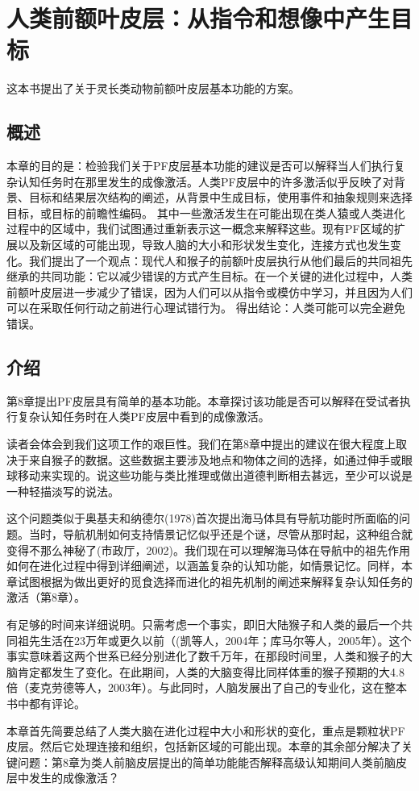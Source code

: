 \chapter{人类前额叶皮层：从指令和想像中产生目标} \label{chap:chap9}
这本书提出了关于灵长类动物前额叶皮层基本功能的方案。

\section{概述}
本章的目的是：检验我们关于PF皮层基本功能的建议是否可以解释当人们执行复杂认知任务时在那里发生的成像激活。人类PF皮层中的许多激活似乎反映了对背景、目标和结果层次结构的阐述，从背景中生成目标，使用事件和抽象规则来选择目标，或目标的前瞻性编码。 其中一些激活发生在可能出现在类人猿或人类进化过程中的区域中，我们试图通过重新表示这一概念来解释这些。现有PF区域的扩展以及新区域的可能出现，导致人脑的大小和形状发生变化，连接方式也发生变化。我们提出了一个观点：现代人和猴子的前额叶皮层执行从他们最后的共同祖先继承的共同功能：它以减少错误的方式产生目标。在一个关键的进化过程中，人类前额叶皮层进一步减少了错误，因为人们可以从指令或模仿中学习，并且因为人们可以在采取任何行动之前进行心理试错行为。 得出结论：人类可能可以完全避免错误。
\section{介绍}
第8章提出PF皮层具有简单的基本功能。本章探讨该功能是否可以解释在受试者执行复杂认知任务时在人类PF皮层中看到的成像激活。
\par
读者会体会到我们这项工作的艰巨性。我们在第8章中提出的建议在很大程度上取决于来自猴子的数据。这些数据主要涉及地点和物体之间的选择，如通过伸手或眼球移动来实现的。说这些功能与类比推理或做出道德判断相去甚远，至少可以说是一种轻描淡写的说法。
\par
这个问题类似于奥基夫和纳德尔(1978)首次提出海马体具有导航功能时所面临的问题。当时，导航机制如何支持情景记忆似乎还是个谜，尽管从那时起，这种组合就变得不那么神秘了(市政厅，2002)。我们现在可以理解海马体在导航中的祖先作用如何在进化过程中得到详细阐述，以涵盖复杂的认知功能，如情景记忆。同样，本章试图根据为做出更好的觅食选择而进化的祖先机制的阐述来解释复杂认知任务的激活（第8章）。
\par
有足够的时间来详细说明。只需考虑一个事实，即旧大陆猴子和人类的最后一个共同祖先生活在23万年或更久以前（(凯等人，2004年；库马尔等人，2005年）。这个事实意味着这两个世系已经分别进化了数千万年，在那段时间里，人类和猴子的大脑肯定都发生了变化。在此期间，人类的大脑变得比同样体重的猴子预期的大4.8倍（麦克劳德等人，2003年）。与此同时，人脑发展出了自己的专业化，这在整本书中都有评论。
\par
本章首先简要总结了人类大脑在进化过程中大小和形状的变化，重点是颗粒状PF皮层。然后它处理连接和组织，包括新区域的可能出现。本章的其余部分解决了关键问题：第8章为类人前脑皮层提出的简单功能能否解释高级认知期间人类前脑皮层中发生的成像激活？
